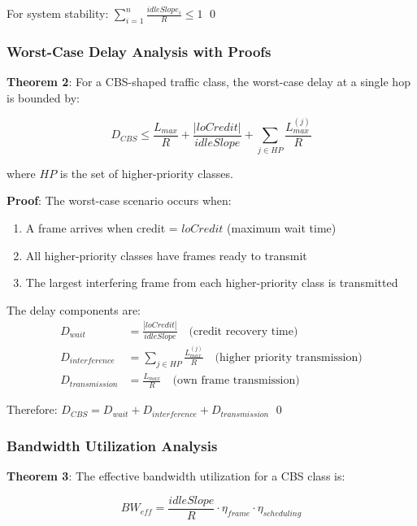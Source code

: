 \documentclass[10pt, journal, compsoc]{IEEEtran}
\begin{document}
For system stability: $\sum_{i=1}^{n} \frac{idleSlope_i}{R} \leq 1$ \qed

\subsubsection{Worst-Case Delay Analysis with Proofs}

\textbf{Theorem 2}: For a CBS-shaped traffic class, the worst-case delay at a single hop is bounded by:

\begin{equation}
D_{CBS} \leq \frac{L_{max}}{R} + \frac{|loCredit|}{idleSlope} + \sum_{j \in HP} \frac{L_{max}^{(j)}}{R}
\end{equation}

where $HP$ is the set of higher-priority classes.

\textbf{Proof}: The worst-case scenario occurs when:
\begin{enumerate}
    \item A frame arrives when credit = $loCredit$ (maximum wait time)
    \item All higher-priority classes have frames ready to transmit
    \item The largest interfering frame from each higher-priority class is transmitted
\end{enumerate}

The delay components are:
\begin{align}
D_{wait} &= \frac{|loCredit|}{idleSlope} \quad \text{(credit recovery time)} \\
D_{interference} &= \sum_{j \in HP} \frac{L_{max}^{(j)}}{R} \quad \text{(higher priority transmission)} \\
D_{transmission} &= \frac{L_{max}}{R} \quad \text{(own frame transmission)}
\end{align}

Therefore: $D_{CBS} = D_{wait} + D_{interference} + D_{transmission}$ \qed

\subsubsection{Bandwidth Utilization Analysis}

\textbf{Theorem 3}: The effective bandwidth utilization for a CBS class is:

\begin{equation}
BW_{eff} = \frac{idleSlope}{R} \cdot \eta_{frame} \cdot \eta_{scheduling}
\end{equation}
\end{document}
